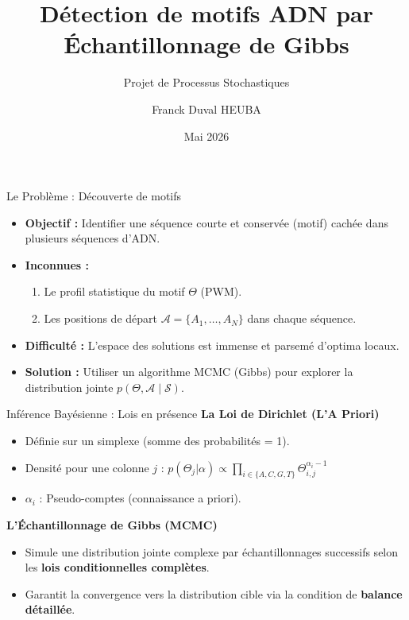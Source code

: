 \documentclass[10pt]{beamer}
\title[Détection de Motifs ADN]{Détection de motifs ADN par Échantillonnage de Gibbs}
\subtitle{Projet de Processus Stochastiques}
\author{Franck Duval HEUBA}
\date{Mai 2026}
\begin{document}
\begin{frame}
    \titlepage
\end{frame}

\begin{frame}{Le Problème : Découverte de motifs}
    \begin{itemize}
        \item \textbf{Objectif :} Identifier une séquence courte et conservée (motif) cachée dans plusieurs séquences d'ADN.
        \item \textbf{Inconnues :} 
            \begin{enumerate}
                \item Le profil statistique du motif $\Theta$ (PWM).
                \item Les positions de départ $\mathcal{A} = \{A_1, \dots, A_N\}$ dans chaque séquence.
            \end{enumerate}
        \item \textbf{Difficulté :} L'espace des solutions est immense et parsemé d'optima locaux.
        \item \textbf{Solution :} Utiliser un algorithme MCMC (Gibbs) pour explorer la distribution jointe $p(\Theta, \mathcal{A} \mid \mathcal{S})$.
    \end{itemize}
\end{frame}

\begin{frame}{Inférence Bayésienne : Lois en présence}
    \textbf{La Loi de Dirichlet (L'A Priori)}
    \begin{itemize}
        \item Définie sur un simplexe (somme des probabilités = 1).
        \item Densité pour une colonne $j$ : 
        $p(\Theta_j | \alpha) \propto \prod_{i \in \{A,C,G,T\}} \Theta_{i,j}^{\alpha_i - 1}$
        \item \textbf{$\alpha_i$} : Pseudo-comptes (connaissance a priori).
    \end{itemize}
    \vspace{0.3cm}
    \textbf{L'Échantillonnage de Gibbs (MCMC)}
    \begin{itemize}
        \item Simule une distribution jointe complexe par échantillonnages successifs selon les \textbf{lois conditionnelles complètes}.
        \item Garantit la convergence vers la distribution cible via la condition de \textbf{balance détaillée}.
    \end{itemize}
\end{frame}
\end{document}
